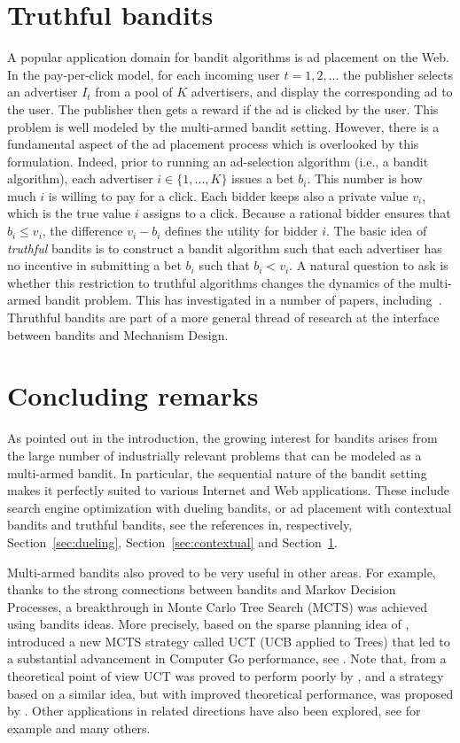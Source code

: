 \documentclass[11pt]{hackednow}
\begin{document}
\section{Truthful bandits} \label{sec:truthful}
A popular application domain for bandit algorithms is ad placement on the Web. In the pay-per-click model, for each incoming user $t=1,2,\dots$ the publisher selects an advertiser $I_t$ from a pool of $K$ advertisers, and display the corresponding ad to the user. The publisher then gets a reward if the ad is clicked by the user. This problem is well modeled by the multi-armed bandit setting. However, there is a fundamental aspect of the ad placement process which is overlooked by this formulation. Indeed, prior to running an ad-selection algorithm (i.e., a bandit algorithm), each advertiser $i \in \{1, \hdots, K\}$ issues a bet $b_i$. This number is how much $i$ is willing to pay for a click. Each bidder keeps also a private value $v_i$, which is the true value $i$ assigns to a click. Because a rational bidder ensures that $b_i \le v_i$, the difference $v_i-b_i$ defines the utility for bidder $i$. The basic idea of {\em truthful} bandits is to construct a bandit algorithm such that each advertiser has no incentive in submitting a bet $b_i$ such that $b_i < v_i$. A natural question to ask is whether this restriction to truthful algorithms changes the dynamics of the multi-armed bandit problem. This has investigated in a number of papers, including~\cite{BSS09, DK09, BKS10, WS12}. Thruthful bandits are part of a more general thread of research at the interface between bandits and Mechanism Design.



\section{Concluding remarks}
As pointed out in the introduction, the growing interest for bandits arises from the large number of industrially relevant problems that can be modeled as a multi-armed bandit. In particular, the sequential nature of the bandit setting makes it perfectly suited to various Internet and Web applications. These include search engine optimization with dueling bandits, or ad placement with contextual bandits and truthful bandits, see the references in, respectively, Section~\ref{sec:dueling}, Section~\ref{sec:contextual} and Section~\ref{sec:truthful}.

Multi-armed bandits also proved to be very useful in other areas. For example, thanks to the strong connections between bandits and Markov Decision Processes, a breakthrough in Monte Carlo Tree Search (MCTS) was achieved using bandits ideas. More precisely, based on the sparse planning idea of \cite{KMN02}, \cite{KS06} introduced a new MCTS strategy called UCT (UCB applied to Trees) that led to a substantial advancement in Computer Go performance, see \cite{GWMT06}. Note that, from a theoretical point of view UCT was proved to perform poorly by \cite{CM07}, and a strategy based on a similar idea, but with improved theoretical performance, was proposed by \cite{BM10}. Other applications in related directions have also been explored, see for example \cite{TT09, HT10b} and many others.
\end{document}
